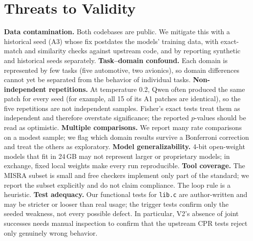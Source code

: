 \documentclass[12pt]{IEEEtran}
\begin{document}
\section{Threats to Validity}
\textbf{Data contamination.} Both codebases are public. We mitigate this with a historical seed (A3) whose fix postdates the models' training data, with exact-match and similarity checks against upstream code, and by reporting synthetic and historical seeds separately.
\textbf{Task--domain confound.} Each domain is represented by few tasks (five automotive, two avionics), so domain differences cannot yet be separated from the behavior of individual tasks.
\textbf{Non-independent repetitions.} At temperature 0.2, Qwen often produced the same patch for every seed (for example, all 15 of its A1 patches are identical), so the five repetitions are not independent samples. Fisher's exact tests treat them as independent and therefore overstate significance; the reported $p$-values should be read as optimistic.
\textbf{Multiple comparisons.} We report many rate comparisons on a modest sample; we flag which domain results survive a Bonferroni correction and treat the others as exploratory.
\textbf{Model generalizability.} 4-bit open-weight models that fit in 24\,GB may not represent larger or proprietary models; in exchange, fixed local weights make every run reproducible.
\textbf{Tool coverage.} The MISRA subset is small and free checkers implement only part of the standard; we report the subset explicitly and do not claim compliance. The loop rule is a heuristic.
\textbf{Test adequacy.} Our functional tests for \texttt{lib.c} are author-written and may be stricter or looser than real usage; the trigger tests confirm only the seeded weakness, not every possible defect. In particular, V2's absence of joint successes needs manual inspection to confirm that the upstream CPR tests reject only genuinely wrong behavior.

\end{document}
